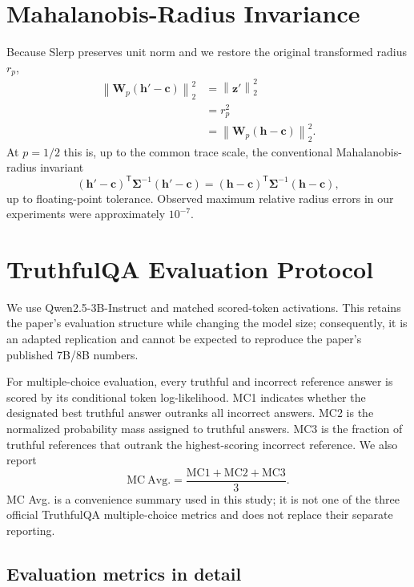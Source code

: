 \documentclass[11pt]{article}
\newcommand{\norm}[1]{\left\lVert #1\right\rVert_2}
\newcommand{\trans}{^{\mathsf T}}
\begin{document}
\section{Mahalanobis-Radius Invariance}

Because Slerp preserves unit norm and we restore the original transformed
radius $r_p$,
\begin{align}
  \norm{\bm W_p(\bm h'-\bm c)}^2
  &=\norm{\bm z'}^2\\
  &=r_p^2\\
  &=\norm{\bm W_p(\bm h-\bm c)}^2.
\end{align}
At $p=1/2$ this is, up to the common trace scale, the conventional
Mahalanobis-radius invariant
\begin{equation}
 (\bm h'-\bm c)\trans\bm\Sigma^{-1}(\bm h'-\bm c)
 =
 (\bm h-\bm c)\trans\bm\Sigma^{-1}(\bm h-\bm c),
\end{equation}
up to floating-point tolerance.  Observed maximum relative radius errors in
our experiments were approximately $10^{-7}$.

\section{TruthfulQA Evaluation Protocol}

We use Qwen2.5-3B-Instruct and matched scored-token activations. This retains the paper's
evaluation structure while changing the model size; consequently, it is an
adapted replication and cannot be expected to reproduce the paper's published
7B/8B numbers.

For multiple-choice evaluation, every truthful and incorrect reference answer
is scored by its conditional token log-likelihood.  MC1 indicates whether the
designated best truthful answer outranks all incorrect answers.  MC2 is the
normalized probability mass assigned to truthful answers.  MC3 is the fraction
of truthful references that outrank the highest-scoring incorrect reference.
We also report
\begin{equation}
  \mathrm{MC\ Avg.}=\frac{\mathrm{MC1}+\mathrm{MC2}+\mathrm{MC3}}{3}.
\end{equation}
MC Avg. is a convenience summary used in this study; it is not one of the
three official TruthfulQA multiple-choice metrics and does not replace their
separate reporting.

\subsection{Evaluation metrics in detail}
\end{document}
